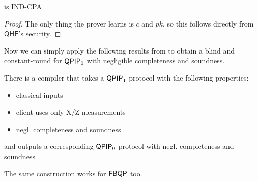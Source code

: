 \begin{thm}
	 is IND-CPA
\end{thm}
\begin{proof}
	The only thing the prover learns is $c$ and $pk$, so this follows directly from $\mathsf{QHE}$'s security.
\end{proof}

Now we can simply apply the following results from \cite{parallelrep} to obtain a blind and constant-round for $\operatorname{\mathsf{QPIP}}_0$ with negligible completeness and soundness.
\begin{thm}
	There is a compiler that takes a $\operatorname{\mathsf{QPIP}}_1$ protocol with the following properties:
	\begin{itemize}
		\item classical inputs
		\item client uses only X/Z measurements
		\item negl. completeness and soundness
	\end{itemize}
	and outputs a corresponding $\operatorname{\mathsf{QPIP}}_0$ protocol with negl. completeness and soundness 
\end{thm}

\begin{rmk}
	The same construction works for $\operatorname{\mathsf{FBQP}}$ too.
\end{rmk}
